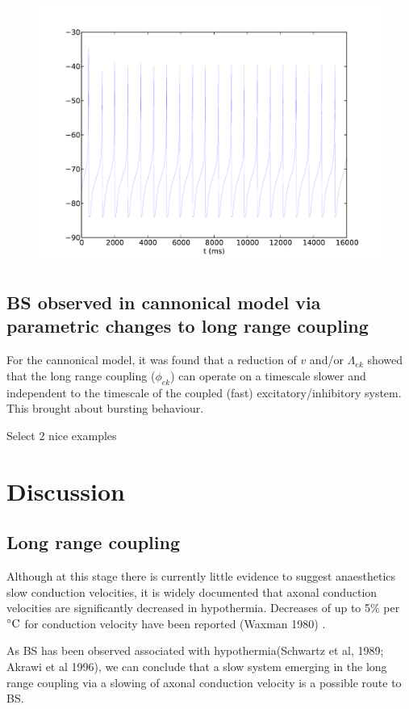 \documentclass[a4paper,12pt]{article}
\begin{document}
\begin{figure}
\includegraphics[scale=0.4]{chosen-frontiers-2012/00493-0_2-5-1_5-1-he-intra.pdf}

\end{figure}

\subsection{BS observed in cannonical model via parametric changes to long range coupling}
For the cannonical model, it was found that a reduction of $v$ and/or $\Lambda_{ek}$ showed that the long range coupling
($\phi_{ek}$) can operate on a timescale slower and independent to the timescale of the coupled (fast)
excitatory/inhibitory system. This brought about bursting behaviour.

Select 2 nice examples


\section{Discussion}

\subsection{Long range coupling}
Although at this stage there is currently little evidence to suggest anaesthetics slow conduction velocities, it is
widely documented that axonal conduction velocities are significantly decreased in hypothermia. Decreases of up to 5\%
per $^{\circ}{\rm C}$ for conduction velocity have been reported (Waxman 1980) .

As BS has been observed associated with hypothermia(Schwartz et al, 1989; Akrawi et al 1996), we can conclude that  a slow system emerging in the long range coupling via a slowing of axonal conduction velocity is a possible route
to BS.
\end{document}
